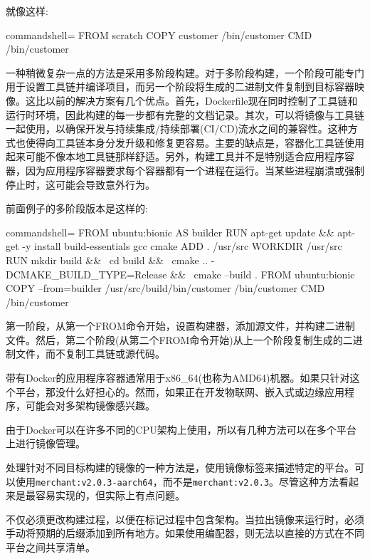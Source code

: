 就像这样:

\begin{tcblisting}{commandshell={}}
FROM scratch
COPY customer /bin/customer
CMD /bin/customer
\end{tcblisting}

一种稍微复杂一点的方法是采用多阶段构建。对于多阶段构建，一个阶段可能专门用于设置工具链并编译项目，而另一个阶段将生成的二进制文件复制到目标容器映像。这比以前的解决方案有几个优点。首先，Dockerfile现在同时控制了工具链和运行时环境，因此构建的每一步都有完整的文档记录。其次，可以将镜像与工具链一起使用，以确保开发与持续集成/持续部署(CI/CD)流水之间的兼容性。这种方式也使得向工具链本身分发升级和修复更容易。主要的缺点是，容器化工具链使用起来可能不像本地工具链那样舒适。另外，构建工具并不是特别适合应用程序容器，因为应用程序容器要求每个容器都有一个进程在运行。当某些进程崩溃或强制停止时，这可能会导致意外行为。

前面例子的多阶段版本是这样的:

\begin{tcblisting}{commandshell={}}
FROM ubuntu:bionic AS builder
RUN apt-get update && apt-get -y install build-essentials gcc cmake
ADD . /usr/src
WORKDIR /usr/src
RUN mkdir build && \
    cd build && \
    cmake .. -DCMAKE_BUILD_TYPE=Release && \
    cmake --build .
FROM ubuntu:bionic
COPY --from=builder /usr/src/build/bin/customer /bin/customer
CMD /bin/customer
\end{tcblisting}

第一阶段，从第一个FROM命令开始，设置构建器，添加源文件，并构建二进制文件。然后，第二个阶段(从第二个FROM命令开始)从上一个阶段复制生成的二进制文件，而不复制工具链或源代码。


带有Docker的应用程序容器通常用于x86\_64(也称为AMD64)机器。如果只针对这个平台，那没什么好担心的。然而，如果正在开发物联网、嵌入式或边缘应用程序，可能会对多架构镜像感兴趣。

由于Docker可以在许多不同的CPU架构上使用，所以有几种方法可以在多个平台上进行镜像管理。

处理针对不同目标构建的镜像的一种方法是，使用镜像标签来描述特定的平台。可以使用\texttt{merchant:v2.0.3-aarch64}，而不是\texttt{merchant:v2.0.3}。尽管这种方法看起来是最容易实现的，但实际上有点问题。

不仅必须更改构建过程，以便在标记过程中包含架构。当拉出镜像来运行时，必须手动将预期的后缀添加到所有地方。如果使用编配器，则无法以直接的方式在不同平台之间共享清单。

